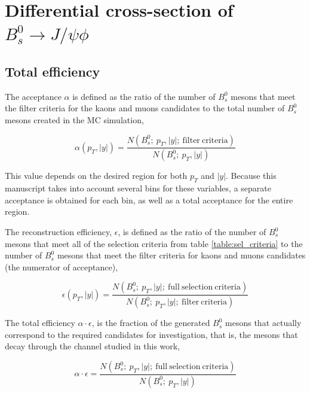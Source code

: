\chapter[\leavevmode\newline Differential cross-section of $B^0_s \to J/\psi \phi$]{Differential cross-section of $B^0_s \to J/\psi \phi$}
\label{chap:Chapter_5}

\section{Total efficiency}

The acceptance $\alpha$ is defined as the ratio of the number of $B^0_s$ mesons that meet the filter criteria for the kaons and muons candidates to the total number of $B^0_s$ mesons created in the MC simulation,

\begin{equation}
\alpha(p_T, |y|) = \frac{N(B^0_s; \ p_T, |y| ; \ \mathrm{filter \ criteria})}{N(B^0_s; \ p_T, |y| )}
\end{equation}

This value depends on the desired region for both $p_T$ and $|y|$. Because this manuscript takes into account several bins for these variables, a separate acceptance is obtained for each bin, as well as a total acceptance for the entire region. 

The reconstruction efficiency, $\epsilon$, is defined as the ratio of the number of $B^0_s$ mesons that meet all of the selection criteria from table \ref{table:sel_criteria} to the number of $B^0_s$ mesons that meet the filter criteria for kaons and muons candidates (the numerator of acceptance),

\begin{equation}
	\epsilon(p_T, |y|) = \frac{N(B^0_s; \ p_T, |y| ; \ \mathrm{full \ selection \ criteria})}{N(B^0_s; \ p_T, |y| ; \ \mathrm{filter \ criteria})}
\end{equation}

The total efficiency $\alpha \cdot \epsilon$, is the fraction of the generated $B^0_s$ mesons that actually correspond to the required candidates for investigation, that is, the mesons that decay through the channel studied in this work,

\begin{equation}
	\alpha \cdot \epsilon = \frac{N(B^0_s; \ p_T, |y| ; \ \mathrm{full \ selection \ criteria})}{N(B^0_s; \ p_T, |y|)}
\end{equation}

